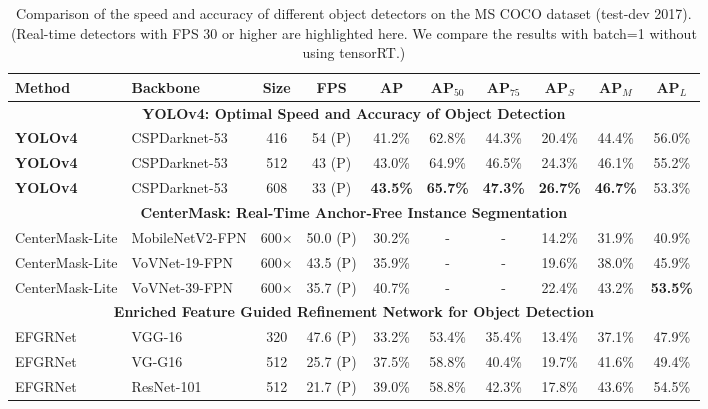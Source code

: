 \documentclass[10pt,twocolumn,letterpaper]{article}
\begin{document}
\begin{table*}[h]
	\centering
	\begin{threeparttable}[h]
		\footnotesize
		\caption{Comparison of the speed and accuracy of different object detectors on the MS COCO dataset (test-dev 2017). (Real-time detectors with FPS 30 or higher are highlighted here. We compare the results with batch=1 without using tensorRT.)}
		\label{table:pascal}
		\begin{tabular}{llcccccccc}
			\toprule
			\textbf{Method} & \textbf{Backbone} & \textbf{Size} & \textbf{FPS} & \textbf{AP} & \textbf{AP$_{50}$} & \textbf{AP$_{75}$} & \textbf{AP$_S$} & \textbf{AP$_M$} & \textbf{AP$_L$} \\	
			\midrule
			\multicolumn{10}{c}{\textbf{YOLOv4: Optimal Speed and Accuracy of Object Detection}} \\
			\rowcolor{cyan}\textbf{YOLOv4} & CSPDarknet-53 & 416 & 54 (P) & 41.2\% & 62.8\% & 44.3\% & 20.4\% & 44.4\% & 56.0\% \\
			\rowcolor{cyan}\textbf{YOLOv4} & CSPDarknet-53 & 512 & 43 (P) & 43.0\% & 64.9\% & 46.5\% & 24.3\% & 46.1\% & 55.2\% \\
			\rowcolor{cyan}\textbf{YOLOv4} & CSPDarknet-53 & 608 & 33 (P) & \textbf{43.5\%} & \textbf{65.7\%} & \textbf{47.3\%} & \textbf{26.7\%} & \textbf{46.7\%} & 53.3\% \\
			\midrule
			\multicolumn{10}{c}{\textbf{CenterMask: Real-Time Anchor-Free Instance Segmentation \cite{lee2019centermask}}} \\
			\rowcolor{cyan}CenterMask-Lite & MobileNetV2-FPN & 600$\times$ & 50.0 (P) & 30.2\% & - & - & 14.2\% & 31.9\% & 40.9\% \\
			\rowcolor{cyan}CenterMask-Lite & VoVNet-19-FPN & 600$\times$ & 43.5 (P) & 35.9\% & - & - & 19.6\% & 38.0\% & 45.9\% \\
			\rowcolor{cyan}CenterMask-Lite & VoVNet-39-FPN & 600$\times$ & 35.7 (P) & 40.7\% & - & - & 22.4\% & 43.2\% & \textbf{53.5\%} \\
			\midrule
			\multicolumn{10}{c}{\textbf{Enriched Feature Guided Refinement Network for Object Detection \cite{nie2019enriched}}} \\
			\rowcolor{cyan}EFGRNet & VGG-16 & 320 & 47.6 (P) & 33.2\% & 53.4\% & 35.4\% & 13.4\% & 37.1\% & 47.9\% \\
			EFGRNet & VG-G16 & 512 & 25.7 (P) & 37.5\% & 58.8\% & 40.4\% & 19.7\% & 41.6\% & 49.4\% \\
			EFGRNet & ResNet-101 & 512 & 21.7 (P) & 39.0\% & 58.8\% & 42.3\% & 17.8\% & 43.6\% & 54.5\% \\

\end{tabular}
\end{threeparttable}
\end{table*}
\end{document}
